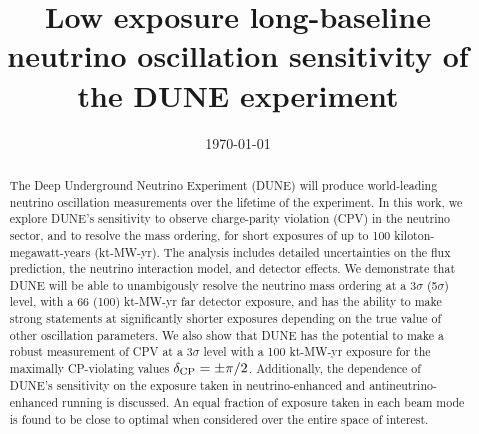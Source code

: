 \documentclass[aps,prd,twocolumn,showpacs,superscriptaddress,nofootinbib,floatfix,letterpaper]{revtex4-1}
\newcommand{\deltacp}{\ensuremath{\delta_{\rm CP}}\xspace}   %
\begin{document}
\title{Low exposure long-baseline neutrino oscillation sensitivity of the DUNE experiment}
\date{\today}
\noaffiliation
% 
\linenumbers
\begin{abstract}
The Deep Underground Neutrino Experiment (DUNE) will produce world-leading neutrino oscillation measurements over the lifetime of the experiment. In this work, we explore DUNE's sensitivity to observe charge-parity violation (CPV) in the neutrino sector, and to resolve the mass ordering, for short exposures of up to 100 kiloton-megawatt-years (kt-MW-yr). The analysis includes detailed uncertainties on the flux prediction, the neutrino interaction model, and detector effects. We demonstrate that DUNE will be able to unambigously resolve the neutrino mass ordering at a 3$\sigma$ (5$\sigma$) level, with a 66 (100) kt-MW-yr far detector exposure, and has the ability to make strong statements at significantly shorter exposures depending on the true value of other oscillation parameters. We also show that DUNE has the potential to make a robust measurement of CPV at a 3$\sigma$ level with a 100 kt-MW-yr exposure for the maximally CP-violating values $\deltacp = \pm\pi/2$. Additionally, the dependence of DUNE's sensitivity on the exposure taken in neutrino-enhanced and antineutrino-enhanced running is discussed. An equal fraction of exposure taken in each beam mode is found to be close to optimal when considered over the entire space of interest.
\end{abstract}

\maketitle











\appendix*

\end{document}
